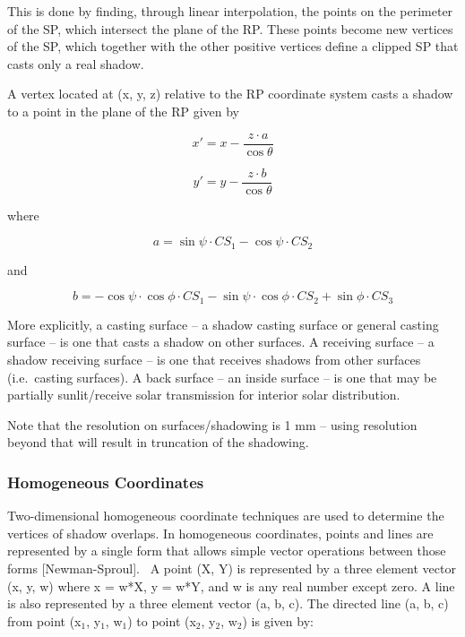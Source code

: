 This is done by finding, through linear interpolation, the points on the perimeter of the SP, which intersect the plane of the RP. These points become new vertices of the SP, which together with the other positive vertices define a clipped SP that casts only a real shadow.

A vertex located at (x, y, z) relative to the RP coordinate system casts a shadow to a point in the plane of the RP given by

\begin{equation}
{x'} = x - \frac{{z\cdot a}}{{\cos \theta }}
\end{equation}

\begin{equation}
{y'} = y - \frac{{z\cdot b}}{{\cos \theta }}
\end{equation}

where

\begin{equation}
a = \sin \psi \cdot C{S_1} - \cos \psi \cdot C{S_2}
\end{equation}

and

\begin{equation}
b =  - \cos \psi \cdot \cos \phi \cdot C{S_1} - \sin \psi \cdot \cos \phi \cdot C{S_2} + \sin \phi \cdot C{S_3}
\end{equation}

More explicitly, a casting surface -- a shadow casting surface or general casting surface -- is one that casts a shadow on other surfaces. A receiving surface -- a shadow receiving surface -- is one that receives shadows from other surfaces (i.e.~casting surfaces). A back surface -- an inside surface -- is one that may be partially sunlit/receive solar transmission for interior solar distribution.

Note that the resolution on surfaces/shadowing is 1 mm -- using resolution beyond that will result in truncation of the shadowing.

\subsubsection{Homogeneous Coordinates}\label{homogeneous-coordinates}

Two-dimensional homogeneous coordinate techniques are used to determine the vertices of shadow overlaps. In homogeneous coordinates, points and lines are represented by a single form that allows simple vector operations between those forms {[}Newman-Sproul{]}.~ A point (X, Y) is represented by a three element vector (x, y, w) where x = w*X, y = w*Y, and w is any real number except zero. A line is also represented by a three element vector (a, b, c). The directed line (a, b, c) from point (x\(_{1}\), y\(_{1}\), w\(_{1}\)) to point (x\(_{2}\), y\(_{2}\), w\(_{2}\)) is given by:

